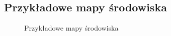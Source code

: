 \documentclass[a4paper, 12pt]{article}
\begin{document}
	\subsection{Przykładowe mapy środowiska}
	\begin{figure}[h!]
		\centering
		\caption{Przykładowe mapy środowiska}
	\end{figure}
\end{document}
